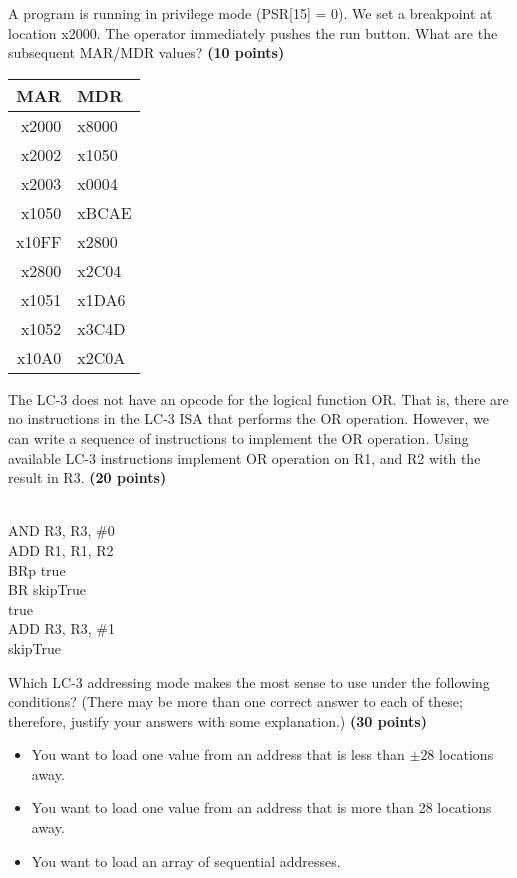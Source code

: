 \documentclass[10pt,answers]{exam}
\newcommand{\qpoints}[1]{\hfill \textbf{(#1 points)}}
\begin{document}
\begin{questions}

\question A program is running in privilege mode (PSR[15] = 0). We set a breakpoint at location x2000. The operator immediately pushes the run button. What are the subsequent MAR/MDR values? \qpoints{10}

\begin{tabular}{|r|l|}
\hline
\textbf{MAR} & \textbf{MDR} \\
\hline
x2000 & x8000 \\
x2002 & x1050 \\
x2003 & x0004 \\
x1050 & xBCAE \\
x10FF & x2800 \\
x2800 & x2C04 \\
x1051 & x1DA6 \\
x1052 & x3C4D \\
x10A0 & x2C0A \\
\hline
\end{tabular} 

\question The LC-3 does not have an opcode for the logical function OR. That is, there are no instructions in the LC-3 ISA that performs the OR operation. However, we can write a sequence of instructions to implement the OR operation. Using available LC-3 instructions implement OR operation on R1, and R2 with the result in R3.  \qpoints{20}

\begin{solution}\\
    AND R3, R3, \#0\\
	ADD R1, R1, R2\\
	BRp true\\
	BR skipTrue\\
	true\\
	ADD R3, R3, \#1\\
	skipTrue\\
\end{solution}

\question Which LC-3 addressing mode makes the most sense to use under the following conditions? (There may be more than one correct answer to each of these; therefore, justify your answers with some explanation.) \qpoints{30}

\begin{itemize}
  \item You want to load one value from an address that is less than $\pm 28$ locations away.
  \item You want to load one value from an address that is more than 28 locations away.
  \item You want to load an array of sequential addresses.
\end{itemize}
	

\end{questions}
\end{document}
